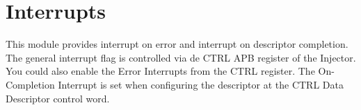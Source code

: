 \section{Interrupts}

This module provides interrupt on error and interrupt on descriptor completion. The general interrupt flag is controlled via de CTRL APB register of the Injector. 
You could also enable the Error Interrupts from the CTRL register. The On-Completion Interrupt is set when configuring the descriptor at the CTRL Data Descriptor control word. 